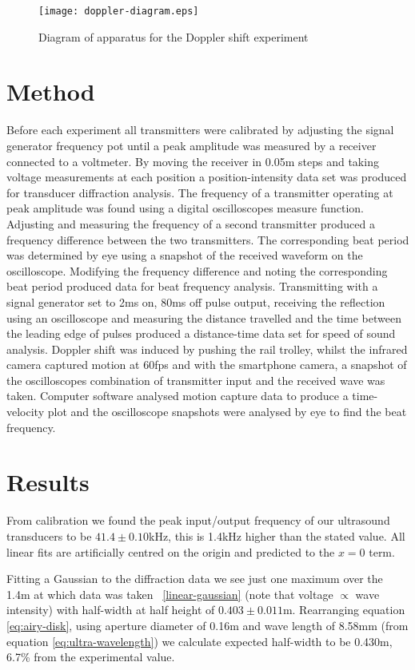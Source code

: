 \documentclass[a4paper,10pt,journal]{IEEEtran}
\newcommand{\figref}[2][\figurename~]{#1\ref{#2}}
\begin{document}
\begin{figure}
	\centering
	\texttt{[image: doppler-diagram.eps]}
	\caption{Diagram of apparatus for the Doppler shift experiment}
	\label{doppler-diagram}
\end{figure}


\section{Method}

Before each experiment all transmitters were calibrated by adjusting the signal generator frequency pot until a peak amplitude was measured by a receiver connected to a voltmeter. By moving the receiver in 0.05m steps and taking voltage measurements at each position a position-intensity data set was produced for transducer diffraction analysis.
The frequency of a transmitter operating at peak amplitude was found using a digital oscilloscopes measure function. Adjusting and measuring the frequency of a second transmitter produced a frequency difference between the two transmitters. The corresponding beat period  was determined by eye using a snapshot of the received waveform on the oscilloscope. Modifying the frequency difference and noting the corresponding beat period produced data for beat frequency analysis.
Transmitting with a signal generator set to 2ms on, 80ms off pulse output, receiving the reflection using an oscilloscope and measuring the distance travelled and the time between the leading edge of pulses produced a distance-time data set for speed of sound analysis.
Doppler shift was induced by pushing the rail trolley, whilst the infrared camera captured motion at 60fps and with the smartphone camera, a snapshot of the oscilloscopes combination of transmitter input and the received wave was taken. Computer software analysed motion capture data to produce a time-velocity plot and the oscilloscope snapshots were analysed by eye to find the beat frequency.

\section{Results}

From calibration we found the peak input/output frequency of our ultrasound transducers to be $41.4 \pm 0.10$kHz, this is 1.4kHz higher than the stated value. All linear fits are artificially centred on the origin and predicted to the $x=0$ term.

Fitting a Gaussian to the diffraction data we see just one maximum over the 1.4m at which data was taken \figref{linear-gaussian} (note that voltage $\propto$ wave intensity) with half-width at half height of $0.403 \pm 0.011$m. Rearranging equation \eqref{eq:airy-disk}, using aperture diameter of 0.16m and wave length of 8.58mm (from equation \eqref{eq:ultra-wavelength}) we calculate expected half-width to be 0.430m, 6.7\% from the experimental value.
\end{document}
